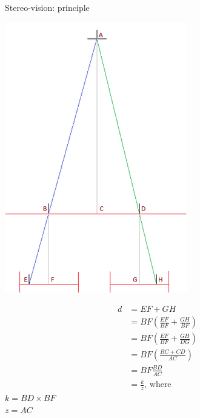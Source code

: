\documentclass[compress]{beamer}
\begin{document}
\begin{frame}{Stereo-vision: principle}
    \begin{multicols}{2}

    \begin{center}
        \includegraphics[height=0.8\paperheight]{stereo}
    \end{center}

    \begin{align} 
d &= EF + GH \\ 
    &= BF (\frac{EF}{BF} + \frac{GH}{BF})\\ 
    &= BF (\frac{EF}{BF} + \frac{GH}{DG})  \\ 
    &= BF (\frac{BC + CD}{AC})  \\ 
    &= BF \frac{BD}{AC}  \\ 
    &= \frac{k}{z}  \text{, where} \end{align}
        $k = BD \times BF$\\
        $z = AC$
\end{multicols}
\end{frame}
\end{document}
